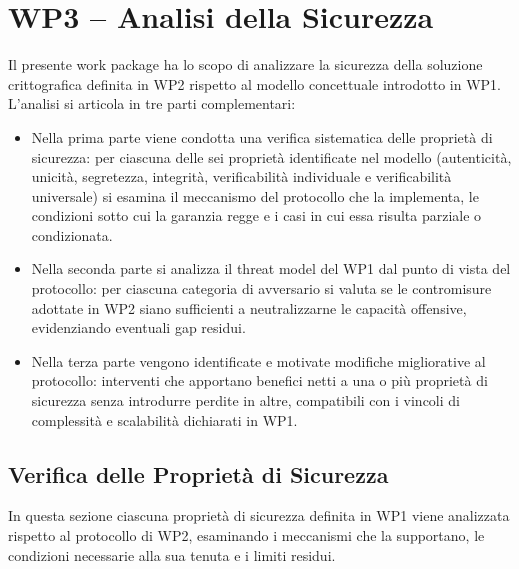 \documentclass[12pt,a4paper]{article}
\begin{document}
\newpage

\section{WP3 – Analisi della Sicurezza}

Il presente work package ha lo scopo di analizzare la sicurezza della soluzione crittografica definita in WP2 rispetto al modello concettuale introdotto in WP1. L'analisi si articola in tre parti complementari:
\begin{itemize}
  \item Nella prima parte viene condotta una verifica sistematica delle proprietà di sicurezza: per ciascuna delle sei proprietà identificate nel modello (autenticità, unicità, segretezza, integrità, verificabilità individuale e verificabilità universale) si esamina il meccanismo del protocollo che la implementa, le condizioni sotto cui la garanzia regge e i casi in cui essa risulta parziale o condizionata.
  \item Nella seconda parte si analizza il threat model del WP1 dal punto di vista del protocollo: per ciascuna categoria di avversario si valuta se le contromisure adottate in WP2 siano sufficienti a neutralizzarne le capacità offensive, evidenziando eventuali gap residui.
  \item Nella terza parte vengono identificate e motivate modifiche migliorative al protocollo: interventi che apportano benefici netti a una o più proprietà di sicurezza senza introdurre perdite in altre, compatibili con i vincoli di complessità e scalabilità dichiarati in WP1.
\end{itemize}

\subsection{Verifica delle Proprietà di Sicurezza}

In questa sezione ciascuna proprietà di sicurezza definita in WP1 viene analizzata rispetto al protocollo di WP2, esaminando i meccanismi che la supportano, le condizioni necessarie alla sua tenuta e i limiti residui.
\end{document}
